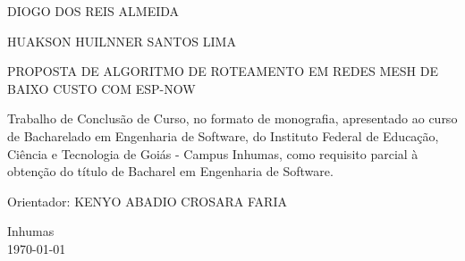 \begin{titlepage}
	\begin{center}
		\vspace*{2cm} %
		
			{DIOGO DOS REIS ALMEIDA \par} 
	        {HUAKSON HUILNNER SANTOS LIMA \par}
			\vspace{3cm}
		
		{\normalsize PROPOSTA DE ALGORITMO DE ROTEAMENTO EM REDES MESH DE BAIXO CUSTO COM ESP-NOW} \\[2cm] %
	\end{center}
	
	\noindent
	\begin{flushleft}
		\setlength{\leftskip}{4cm} %
		\setlength{\rightskip}{1cm} %
		\setlength{\parindent}{0pt} %
		Trabalho de Conclusão de Curso, no formato de monografia, apresentado ao curso de Bacharelado em Engenharia de Software, do Instituto Federal de Educação, Ciência e Tecnologia de Goiás - Campus Inhumas, como requisito parcial à obtenção do título de Bacharel em Engenharia de Software.
		
		\vspace{1cm}
		
		\noindent
		Orientador: {KENYO ABADIO CROSARA FARIA} \\[0.5cm]
	\end{flushleft}
	
	\vfill
	\begin{center}
		Inhumas \\[0.5cm]
		\today %
	\end{center}
	
\end{titlepage}
